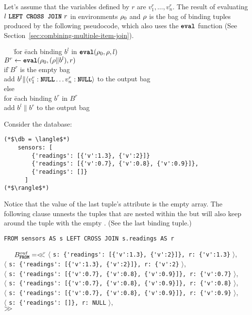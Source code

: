
Let's assume that the variables defined by $r$ are $v^r_1, \ldots, v^r_n$. The
result of evaluating $l\ \LEFTCJOIN\ r$ in environments $\rho_{0}$ and $\rho$ is the
bag of binding tuples produced by the following pseudocode, which also uses the
$\texttt{\textbf{eval}}$ function (See Section~\ref{sec:combining-multiple-item-join}). 

\begin{tabbing}
\ \ \ \=for \=each binding $b^l$ in $\texttt{\textbf{eval}}(\rho_{0}, \rho, l)$\\
\>\>$B^r \leftarrow \texttt{\textbf{eval}}(\rho_{0}, (\rho \| b^l), r)$\\
\>\>if \=$B^r$ is the empty bag\\
\>\>\>add $b^l \| \langle v^r_1:\texttt{\textbf{NULL}} \ldots v^r_n:\texttt{\textbf{NULL}} \rangle$ to the output bag \\
\>\>else\\
\>\>\>for \=each binding $b^r$ in $B^r$\\
\>\>\>\>add $b^l \| b^r$ to the output bag
\end{tabbing}

\begin{example}
Consider the database:

\begin{lstlisting}
(*$\db = \langle$*)
    sensors: [
        {'readings': [{'v':1.3}, {'v':2}]}
        {'readings': [{'v':0.7}, {'v':0.8}, {'v':0.9}]},
        {'readings': []}
      ]
(*$\rangle$*)
\end{lstlisting}

\noindent Notice that the value of the last tuple's  attribute is the empty
array. The following \from clause unnests the tuples that are nested within
the  but will also keep around the tuple with the empty
. (See the last binding tuple.)

\begin{lstlisting}
FROM sensors AS s LEFT CROSS JOIN s.readings AS r
\end{lstlisting}

\begin{tabbing}
\ \ \ $B^{out}_{\texttt{\textbf{FROM}}} = <\!\!<$\=
  $\langle$ \lstinline|s: {'readings': [{'v':1.3}, {'v':2}]}, r: {'v':1.3}| $\rangle$,\\
\>$\langle$ \lstinline|s: {'readings': [{'v':1.3}, {'v':2}]}, r: {'v':2}| $\rangle$,\\
\>$\langle$ \lstinline|s: {'readings': [{'v':0.7}, {'v':0.8}, {'v':0.9}]}, r: {'v':0.7}| $\rangle$,\\
\>$\langle$ \lstinline|s: {'readings': [{'v':0.7}, {'v':0.8}, {'v':0.9}]}, r: {'v':0.8}| $\rangle$,\\
\>$\langle$ \lstinline|s: {'readings': [{'v':0.7}, {'v':0.8}, {'v':0.9}]}, r: {'v':0.9}| $\rangle$,\\
\>$\langle$ \lstinline|s: {'readings': []}, r: NULL| $\rangle$,\\
\>$>\!\!>$
\end{tabbing}
\end{example}

